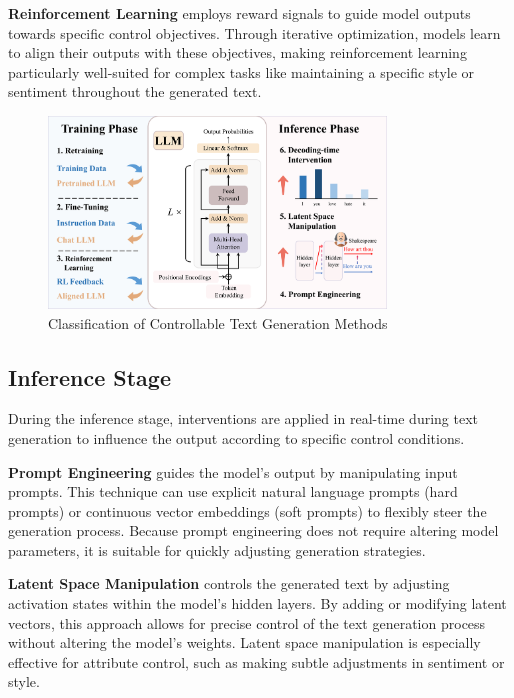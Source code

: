 \documentclass[acmsmall, screen]{acmart}
\begin{document}
\textbf{Reinforcement Learning}\cite{khalifa_iclr21_GDC,upadhyay_arxiv22_DRL,dai_iclr24_SafeRLHF} employs reward signals to guide model outputs towards specific control objectives. Through iterative optimization, models learn to align their outputs with these objectives, making reinforcement learning particularly well-suited for complex tasks like maintaining a specific style or sentiment throughout the generated text.

\begin{figure}[ht]
    \centering
    \includegraphics[width=0.8\textwidth]{figures/methods_classification.pdf}
    \caption{Classification of Controllable Text Generation Methods}
    \label{fig:methods_classification}
\end{figure}

\subsection{Inference Stage}
During the inference stage, interventions are applied in real-time during text generation to influence the output according to specific control conditions.

\textbf{Prompt Engineering}\cite{lester_emnlp21_PromptTuning,li_acl21_PrefixTuning,liu_arxiv21_PTuning} guides the model’s output by manipulating input prompts. This technique can use explicit natural language prompts (hard prompts) or continuous vector embeddings (soft prompts) to flexibly steer the generation process. Because prompt engineering does not require altering model parameters, it is suitable for quickly adjusting generation strategies.

\textbf{Latent Space Manipulation}\cite{subramani_acl22_LatentStreeringVectors,liu_arxiv24_ICV,turner_arxiv24_actadd} controls the generated text by adjusting activation states within the model's hidden layers. By adding or modifying latent vectors, this approach allows for precise control of the text generation process without altering the model’s weights. Latent space manipulation is especially effective for attribute control, such as making subtle adjustments in sentiment or style.
\end{document}
